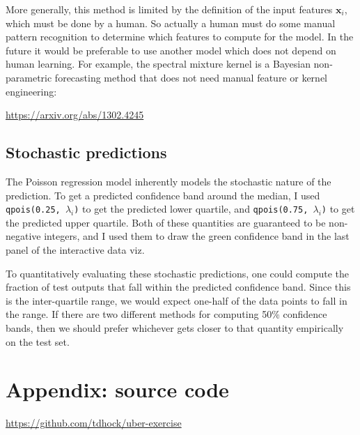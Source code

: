 \documentclass{article}
\begin{document}
More generally, this method is limited by the definition of the input
features $\mathbf x_i$, which must be done by a human. So actually a
human must do some manual pattern recognition to determine which
features to compute for the model. In the future it would be
preferable to use another model which does not depend on human
learning. For example, the spectral mixture kernel is a Bayesian
non-parametric forecasting method that does not need manual feature or
kernel engineering:

\url{https://arxiv.org/abs/1302.4245}

\subsection{Stochastic predictions}

The Poisson regression model inherently models the stochastic nature
of the prediction. To get a predicted confidence band around the
median, I used \texttt{qpois(0.25, $\lambda_i$)} to get the predicted
lower quartile, and \texttt{qpois(0.75, $\lambda_i$)} to get the
predicted upper quartile. Both of these quantities are guaranteed to
be non-negative integers, and I used them to draw the green confidence
band in the last panel of the interactive data viz.

To quantitatively evaluating these stochastic predictions, one could
compute the fraction of test outputs that fall within the predicted
confidence band. Since this is the inter-quartile range, we would
expect one-half of the data points to fall in the range. If there are
two different methods for computing 50\% confidence bands, then we
should prefer whichever gets closer to that quantity empirically on
the test set.

\section{Appendix: source code}

\url{https://github.com/tdhock/uber-exercise}
\end{document}
